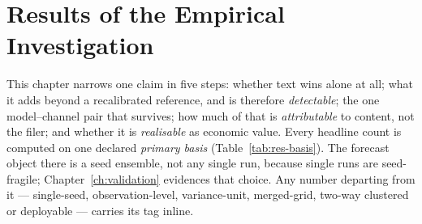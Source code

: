 \chapter{Results of the Empirical Investigation}
\label{ch:results}


This chapter narrows one claim in five steps: whether text wins alone at all; what it adds beyond a recalibrated reference, and is therefore \emph{detectable}; the one model--channel pair that survives; how much of that is \emph{attributable} to content, not the filer; and whether it is \emph{realisable} as economic value. Every headline count is computed on one declared \emph{primary basis} (Table~\ref{tab:res-basis}). The forecast object there is a seed ensemble, not any single run, because single runs are seed-fragile; Chapter~\ref{ch:validation} evidences that choice. %
Any number departing from it --- single-seed, observation-level, variance-unit, merged-grid, two-way clustered or deployable --- carries its tag inline.

